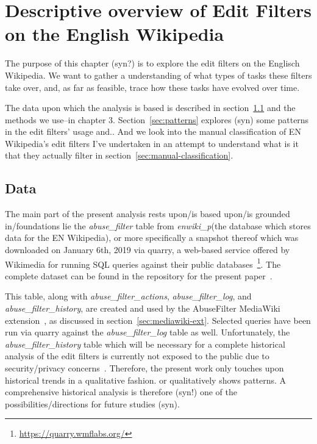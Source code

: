 \chapter{Descriptive overview of Edit Filters on the English Wikipedia}
\label{chap:overview-en-wiki}

The purpose of this chapter (syn?) is to explore the edit filters on the Englisch Wikipedia.
We want to gather a understanding of what types of tasks these filters take over,
and, as far as feasible, trace how these tasks have evolved over time.

The data upon which the analysis is based is described in section~\ref{sec:overview-data}
and the methods we use–in chapter 3.
Section~\ref{sec:patterns} explores (syn) some patterns in the edit filters' usage and..
And we look into the manual classification of EN Wikipedia's edit filters I've undertaken in an attempt to understand what is it that they actually filter in section~\ref{sec:manual-classification}.


\section{Data}
\label{sec:overview-data}

The main part of the present analysis rests upon/is based upon/is grounded in/foundations lie the \emph{abuse\_filter} table from \emph{enwiki\_p}(the database which stores data for the EN Wikipedia), or more specifically a snapshot thereof which was downloaded on January 6th, 2019 via quarry, a web-based service offered by Wikimedia for running SQL queries against their public databases~\footnote{\url{https://quarry.wmflabs.org/}}.
The complete dataset can be found in the repository for the present paper~\cite{github}. %

This table, along with \emph{abuse\_filter\_actions}, \emph{abuse\_filter\_log}, and \emph{abuse\_filter\_history}, are created and used by the AbuseFilter MediaWiki extension~\cite{gerrit-abusefilter-tables}, as discussed in section~\ref{sec:mediawiki-ext}.
Selected queries have been run via quarry against the \emph{abuse\_filter\_log} table as well.
Unfortunately, the \emph{abuse\_filter\_history} table which will be necessary for a complete historical analysis of the edit filters is currently not exposed to the public due to security/privacy concerns~\cite{phabricator}.
Therefore, the present work only touches upon historical trends in a qualitative fashion. %
or qualitatively shows patterns.
A comprehensive historical analysis is therefore (syn!) one of the possibilities/directions for future studies (syn).

